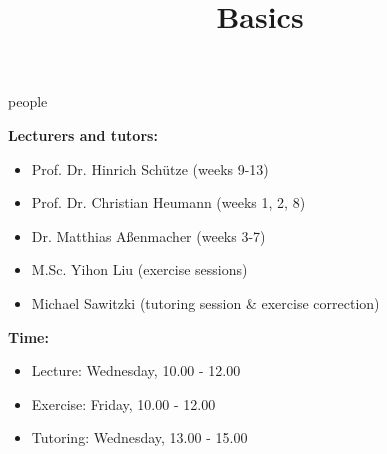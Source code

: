 


\newcommand*\POS[1]{\textsubscript{\texttt{#1}}} %
\usepackage{qtree} %

\newcommand{\learninggoals}{
\item Understand the scope of the course
\item Answers to all open question
\item Get an impression of the workload}

\title{Basics}
\date{}




\begin{vbframe}{people}

\vfill

\textbf{Lecturers and tutors:}

	\begin{itemize}
		\item Prof. Dr. Hinrich Schütze (weeks 9-13)
		\item Prof. Dr. Christian Heumann (weeks 1, 2, 8)
		\item Dr. Matthias Aßenmacher (weeks 3-7)
		\item M.Sc. Yihon Liu (exercise sessions)
		\item Michael Sawitzki (tutoring session \& exercise correction)
	\end{itemize}

\textbf{Time:}

	\begin{itemize}
		\item Lecture: Wednesday, 10.00 - 12.00
		\item Exercise: Friday, 10.00 - 12.00
		\item Tutoring: Wednesday, 13.00 - 15.00
	\end{itemize}

\vfill

\end{vbframe}



